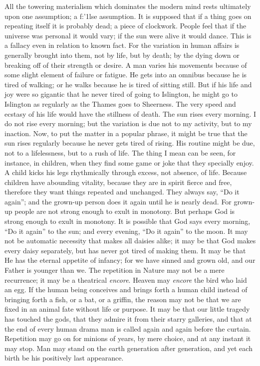\documentclass{book}
\begin{document}
All the towering materialism which dominates the modern mind rests ultimately upon one assumption; a f:’1lse assumption. It is supposed that if a thing goes on repeating itself it is probably dead; a piece of clockwork. People feel that if the universe was personal it would vary; if the sun were alive it would dance. This is a fallacy even in relation to known fact. For the variation in human affairs is generally brought into them, not by life, but by death; by the dying down or breaking off of their strength or desire. A man varies his movements because of some slight element of failure or fatigue. He gets into an omnibus because he is tired of walking; or he walks because he is tired of sitting still. But if his life and joy were so gigantic that he never tired of going to Islington, he might go to Islington as regularly as the Thames goes to Sheerness. The very speed and ecstasy of his life would have the stillness of death. The sun rises every morning. I do not rise every morning; but the variation is due not to my activity, but to my inaction. Now, to put the matter in a popular phrase, it might be true that the sun rises regularly because he never gets tired of rising. His routine might be due, not to a lifelessness, but to a rush of life. The thing I mean can be seen, for instance, in children, when they find some game or joke that they specially enjoy. A child kicks his legs rhythmically through excess, not absence, of life. Because children have abounding vitality, because they are in spirit fierce and free, therefore they want things repeated and unchanged. They always say, “Do it again”; and the grown-up person does it again until he is nearly dead. For grown-up people are not strong enough to exult in monotony. But perhaps God is strong enough to exult in monotony. It is possible that God says every morning, “Do it again” to the sun; and every evening, “Do it again” to the moon. It may not be automatic necessity that makes all daisies alike; it may be that God makes every daisy separately, but has never got tired of making them. It may be that He has the eternal appetite of infancy; for we have sinned and grown old, and our Father is younger than we. The repetition in Nature may not be a mere recurrence; it may be a theatrical \emph{encore}. Heaven may \emph{encore} the bird who laid an egg. If the human being conceives and brings forth a human child instead of bringing forth a fish, or a bat, or a griffin, the reason may not be that we are fixed in an animal fate without life or purpose. It may be that our little tragedy has touched the gods, that they admire it from their starry galleries, and that at the end of every human drama man is called again and again before the curtain. Repetition may go on for minions of years, by mere choice, and at any instant it may stop. Man may stand on the earth generation after generation, and yet each birth be his positively last appearance.
\end{document}
